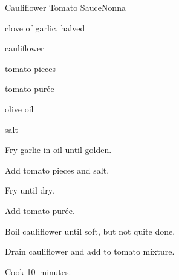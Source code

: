 \begin{recipe}{Cauliflower Tomato Sauce}{Nonna}{}

\begin{ingredients}
\item clove of garlic, halved
\item cauliflower
\item tomato pieces
\item tomato pur\'ee
\item olive oil
\item salt
\end{ingredients}

\begin{directions}
\item Fry garlic in oil until golden.
\item Add tomato pieces and salt.
\item Fry until dry.
\item Add tomato pur\'ee.
\item Boil cauliflower until soft, but not quite done.
\item Drain cauliflower and add to tomato mixture.
\item Cook 10~minutes.
\end{directions}

\end{recipe}
